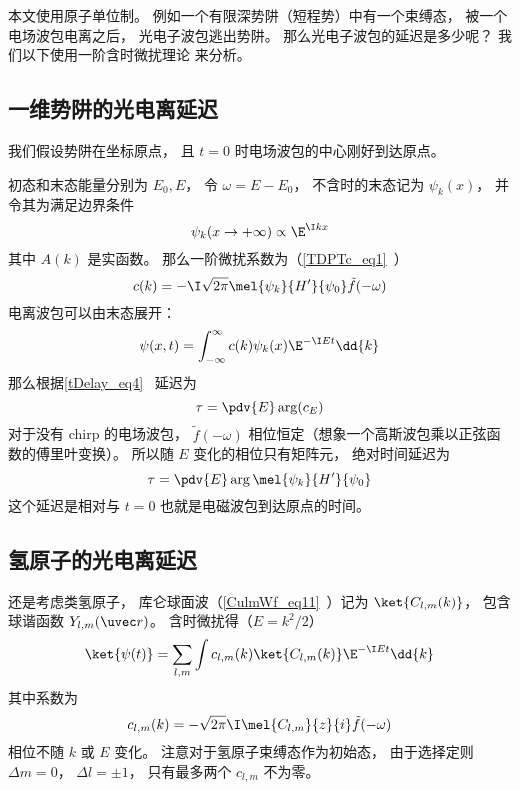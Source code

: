 
\begin{issues}
\issueDraft
\end{issues}


本文使用原子单位制。 例如一个有限深势阱（短程势）中有一个束缚态， 被一个电场波包电离之后， 光电子波包逃出势阱。 那么光电子波包的延迟是多少呢？ 我们以下使用一阶含时微扰理论 来分析。

\subsection{一维势阱的光电离延迟}
我们假设势阱在坐标原点， 且 $t = 0$ 时电场波包的中心刚好到达原点。

初态和末态能量分别为 $E_0, E$， 令 $\omega = E - E_0$， 不含时的末态记为 $\psi_k(x)$， 并令其为满足边界条件
\begin{equation}\label{HeAna2_eq2}
\psi_k(x \to +\infty) \propto \E^{\I kx}
\end{equation}
其中 $A(k)$ 是实函数。 那么一阶微扰系数为（\autoref{TDPTc_eq1}~）
\begin{equation}
c(k) = -\I \sqrt{2\pi} \mel{\psi_k}{H'}{\psi_0} \tilde f(-\omega)
\end{equation}
电离波包可以由末态展开：
\begin{equation}
\psi(x, t) = \int_{-\infty}^{\infty} c(k) \psi_k(x)\E^{-\I E t} \dd{k}
\end{equation}
那么根据\autoref{tDelay_eq4}~ 延迟为
\begin{equation}\label{HeAna2_eq3}
\tau = \pdv{E} \arg (c_E)
\end{equation}
对于没有 chirp 的电场波包， $\tilde f(-\omega)$ 相位恒定（想象一个高斯波包乘以正弦函数的傅里叶变换）。 所以随 $E$ 变化的相位只有矩阵元， 绝对时间延迟为
\begin{equation}\label{HeAna2_eq1}
\tau = \pdv{E} \arg \mel{\psi_k}{H'}{\psi_0}
\end{equation}
这个延迟是相对与 $t = 0$ 也就是电磁波包到达原点的时间。

\subsection{氢原子的光电离延迟}\label{HeAna2_sub1}
还是考虑类氢原子， 库仑球面波（\autoref{CulmWf_eq11}~）记为 $\ket{C_{l,m}(k)}$， 包含球谐函数 $Y_{l,m}(\uvec r)$。 含时微扰得（$E = k^2/2$）
\begin{equation}\label{HeAna2_eq4}
\ket{\psi(t)} = \sum_{l,m} \int c_{l,m}(k) \ket{C_{l,m}(k)} \E^{-\I E t} \dd{k}
\end{equation}
其中系数为
\begin{equation}
c_{l,m}(k) = -\sqrt{2\pi}\I \mel{C_{l,m}}{z}{i} \tilde f(-\omega)
\end{equation}
相位不随 $k$ 或 $E$ 变化。 注意对于氢原子束缚态作为初始态， 由于选择定则 $\Delta m = 0$， $\Delta l = \pm 1$， 只有最多两个 $c_{l,m}$ 不为零。

